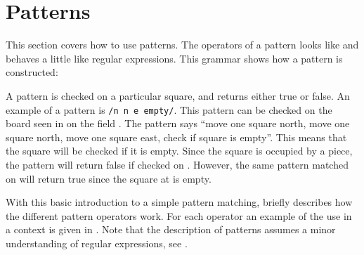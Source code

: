 \section{Patterns}
\label{sec:patterns}

This section covers how to use patterns. The operators of a pattern looks 
like and behaves a little like regular expressions. This
grammar shows how a pattern is constructed:

\begin{ebnf}
\end{ebnf}

\begin{ebnf}
\end{ebnf}


A pattern is checked on a particular square, and returns either true or false.
An example of a pattern is \texttt{/n n e empty/}. This pattern can be checked on
the board seen in  on the field . The pattern
says ``move one square north, move one square north, move one square east, check if
square is empty''. This means that the square  will be checked if it
is empty. Since the square is occupied by a piece, the pattern will return
false if checked on . However, the same pattern matched on
 will return true since the square at  is empty.


With this basic introduction to a simple pattern matching,
 briefly describes how the different pattern
operators work. For each operator an example of the use in a context is given
in . Note that the description of patterns assumes a
minor understanding of regular expressions, see \cite{regex}\cite{perlRegex}.

